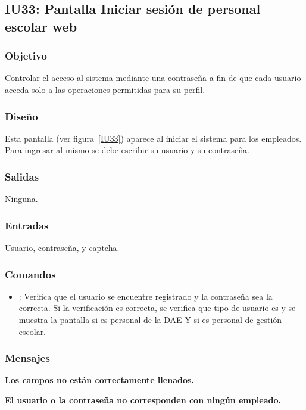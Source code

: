 \subsection{IU33: Pantalla Iniciar sesión de personal escolar web}

\subsubsection{Objetivo}
	Controlar el acceso al sistema mediante una contraseña a fin de que cada usuario acceda solo a las operaciones permitidas para su perfil.

\subsubsection{Diseño}
	Esta pantalla  (ver figura~\ref{IU33}) aparece al iniciar el sistema para los empleados. Para ingresar al mismo se debe escribir su usuario y su contraseña. 


\subsubsection{Salidas}

	Ninguna.

\subsubsection{Entradas}
	Usuario, contraseña, y captcha.

\subsubsection{Comandos}
\begin{itemize}
	\item {}: Verifica que el usuario se encuentre registrado y la contraseña sea la correcta. Si la verificación es correcta, se verifica que tipo de usuario es y se muestra la pantalla  si es personal de la DAE Y  si es personal de gestión escolar.
	
\end{itemize}

\subsubsection{Mensajes}

\begin{Citemize}
	\item {\bf Los campos no están correctamente llenados. }
	\item {\bf El usuario o la contraseña no corresponden con ningún empleado. }
\end{Citemize}

